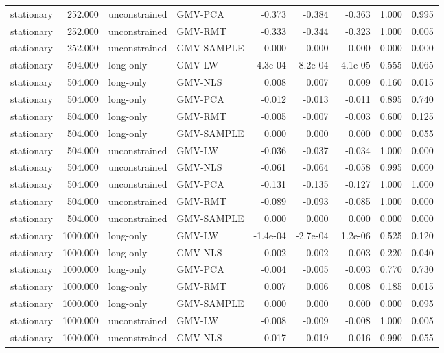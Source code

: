 \begin{table}[t]
{\begin{tabular}{lrllrrrrr}
stationary & 252.000 & unconstrained & GMV-PCA & -0.373 & -0.384 & -0.363 & 1.000 & 0.995 \\
stationary & 252.000 & unconstrained & GMV-RMT & -0.333 & -0.344 & -0.323 & 1.000 & 0.005 \\
stationary & 252.000 & unconstrained & GMV-SAMPLE & 0.000 & 0.000 & 0.000 & 0.000 & 0.000 \\
stationary & 504.000 & long-only & GMV-LW & -4.3e-04 & -8.2e-04 & -4.1e-05 & 0.555 & 0.065 \\
stationary & 504.000 & long-only & GMV-NLS & 0.008 & 0.007 & 0.009 & 0.160 & 0.015 \\
stationary & 504.000 & long-only & GMV-PCA & -0.012 & -0.013 & -0.011 & 0.895 & 0.740 \\
stationary & 504.000 & long-only & GMV-RMT & -0.005 & -0.007 & -0.003 & 0.600 & 0.125 \\
stationary & 504.000 & long-only & GMV-SAMPLE & 0.000 & 0.000 & 0.000 & 0.000 & 0.055 \\
stationary & 504.000 & unconstrained & GMV-LW & -0.036 & -0.037 & -0.034 & 1.000 & 0.000 \\
stationary & 504.000 & unconstrained & GMV-NLS & -0.061 & -0.064 & -0.058 & 0.995 & 0.000 \\
stationary & 504.000 & unconstrained & GMV-PCA & -0.131 & -0.135 & -0.127 & 1.000 & 1.000 \\
stationary & 504.000 & unconstrained & GMV-RMT & -0.089 & -0.093 & -0.085 & 1.000 & 0.000 \\
stationary & 504.000 & unconstrained & GMV-SAMPLE & 0.000 & 0.000 & 0.000 & 0.000 & 0.000 \\
stationary & 1000.000 & long-only & GMV-LW & -1.4e-04 & -2.7e-04 & 1.2e-06 & 0.525 & 0.120 \\
stationary & 1000.000 & long-only & GMV-NLS & 0.002 & 0.002 & 0.003 & 0.220 & 0.040 \\
stationary & 1000.000 & long-only & GMV-PCA & -0.004 & -0.005 & -0.003 & 0.770 & 0.730 \\
stationary & 1000.000 & long-only & GMV-RMT & 0.007 & 0.006 & 0.008 & 0.185 & 0.015 \\
stationary & 1000.000 & long-only & GMV-SAMPLE & 0.000 & 0.000 & 0.000 & 0.000 & 0.095 \\
stationary & 1000.000 & unconstrained & GMV-LW & -0.008 & -0.009 & -0.008 & 1.000 & 0.005 \\
stationary & 1000.000 & unconstrained & GMV-NLS & -0.017 & -0.019 & -0.016 & 0.990 & 0.055 \\

\end{tabular}}
\end{table}
